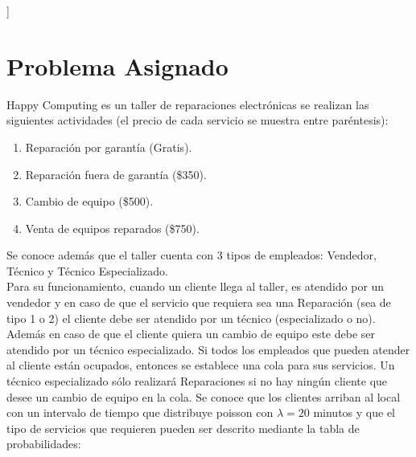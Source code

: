 \documentclass[a4paper,10pt,twocolumn]{article}
\begin{document}
\vspace{0.8cm}
]



\section{Problema Asignado}\label{sec:intro}
Happy Computing es un taller de reparaciones electrónicas se realizan las siguientes actividades (el precio de cada servicio se muestra entre paréntesis): 
\begin{enumerate}
	\item Reparación por garantía (Gratis).
	\item Reparación fuera de garantía (\$350).
	\item Cambio de equipo (\$500).
	\item  Venta de equipos reparados (\$750).
\end{enumerate}

Se conoce además que el taller cuenta con 3 tipos de empleados: Vendedor, Técnico y Técnico Especializado. \\
Para su funcionamiento, cuando un cliente llega al taller, es atendido por un vendedor y en caso de que el servicio que requiera sea una Reparación (sea de tipo 1 o 2) el cliente debe ser atendido por un técnico (especializado o no). \\
Además en caso de que el cliente quiera un cambio de equipo este debe ser atendido por un técnico especializado. Si todos los empleados que pueden atender al cliente están ocupados, entonces se establece una cola para sus servicios. Un
técnico especializado sólo realizará Reparaciones si no hay ningún cliente que desee un cambio de equipo en la cola.
Se conoce que los clientes arriban al local con un intervalo de tiempo que distribuye poisson con $\lambda = 20$ minutos y que el tipo de servicios que requieren pueden ser descrito mediante la tabla de probabilidades:
\end{document}
